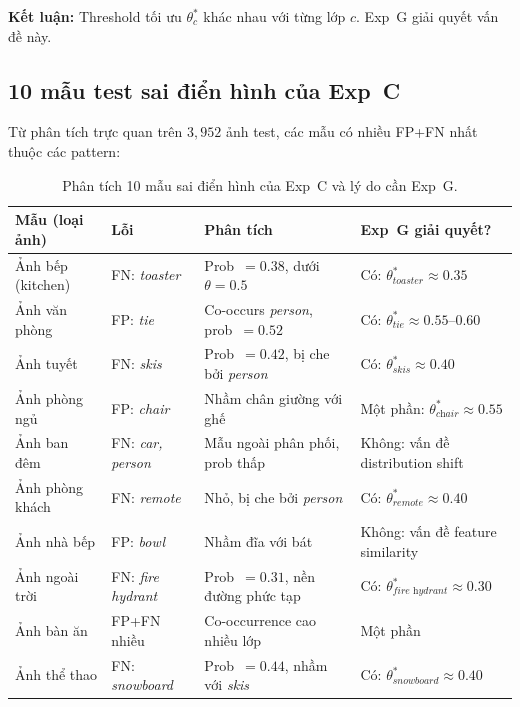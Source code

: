 \documentclass{article}
\begin{document}
\noindent \textbf{Kết luận:} Threshold tối ưu $\theta_c^*$ khác nhau với từng
lớp $c$. Exp~G giải quyết vấn đề này.

\subsection{10 mẫu test sai điển hình của Exp~C}

Từ phân tích trực quan trên $3{,}952$ ảnh test,
các mẫu có nhiều FP+FN nhất thuộc các pattern:

\begin{table}[H]
  \caption{Phân tích 10 mẫu sai điển hình của Exp~C và lý do cần Exp~G.}
  \centering
  \small
  \begin{tabular}{p{2.8cm}p{2.8cm}p{4cm}p{3.5cm}}
    \toprule
    \textbf{Mẫu (loại ảnh)} & \textbf{Lỗi} & \textbf{Phân tích} & \textbf{Exp~G giải quyết?}\\
    \midrule
    Ảnh bếp (kitchen) &
      FN: \textit{toaster} &
      Prob~$= 0.38$, dưới $\theta=0.5$ &
      Có: $\theta_{\textit{toaster}}^* \approx 0.35$ \\
    Ảnh văn phòng &
      FP: \textit{tie} &
      Co-occurs \textit{person}, prob~$= 0.52$ &
      Có: $\theta_{\textit{tie}}^* \approx 0.55$--$0.60$ \\
    Ảnh tuyết &
      FN: \textit{skis} &
      Prob~$= 0.42$, bị che bởi \textit{person} &
      Có: $\theta_{\textit{skis}}^* \approx 0.40$ \\
    Ảnh phòng ngủ &
      FP: \textit{chair} &
      Nhầm chân giường với ghế &
      Một phần: $\theta_{\textit{chair}}^* \approx 0.55$ \\
    Ảnh ban đêm &
      FN: \textit{car, person} &
      Mẫu ngoài phân phối, prob thấp &
      Không: vấn đề distribution shift \\
    Ảnh phòng khách &
      FN: \textit{remote} &
      Nhỏ, bị che bởi \textit{person} &
      Có: $\theta_{\textit{remote}}^* \approx 0.40$ \\
    Ảnh nhà bếp &
      FP: \textit{bowl} &
      Nhầm đĩa với bát &
      Không: vấn đề feature similarity \\
    Ảnh ngoài trời &
      FN: \textit{fire hydrant} &
      Prob~$= 0.31$, nền đường phức tạp &
      Có: $\theta_{\textit{fire hydrant}}^* \approx 0.30$ \\
    Ảnh bàn ăn &
      FP+FN nhiều &
      Co-occurrence cao nhiều lớp &
      Một phần \\
    Ảnh thể thao &
      FN: \textit{snowboard} &
      Prob~$= 0.44$, nhầm với \textit{skis} &
      Có: $\theta_{\textit{snowboard}}^* \approx 0.40$ \\
    \bottomrule
  \end{tabular}
\end{table}
\end{document}
